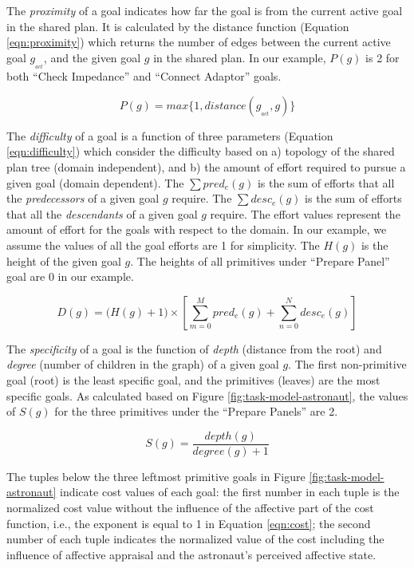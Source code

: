 \documentclass[12pt]{report}
\begin{document}
The \textit{proximity} of a goal indicates how far the goal is from the current
active goal in the shared plan. It is calculated by the distance function
(Equation \ref{eqn:proximity}) which returns the number of edges between the
current active goal $g_{_{act}}$, and the given goal $g$ in the shared plan. In
our example, $P(g)$ is 2 for both ``Check Impedance'' and ``Connect Adaptor''
goals.

\begin{equation}
P(g) = max\big\{1, distance(g_{_{act}},g)\big\}
\label{eqn:proximity}
\end{equation}

The \textit{difficulty} of a goal is a function of three parameters (Equation
\ref{eqn:difficulty}) which consider the difficulty based on a) topology of the
shared plan tree (domain independent), and b) the amount of effort required to
pursue a given goal (domain dependent). The $\sum pred_e(g)$ is the sum of
efforts that all the \textit{predecessors} of a given goal $g$ require. The
$\sum desc_e(g)$ is the sum of efforts that all the \textit{descendants} of a
given goal $g$ require. The effort values represent the amount of effort for the
goals with respect to the domain. In our example, we assume the values of all
the goal efforts are 1 for simplicity. The $H(g)$ is the height of the given
goal $g$. The heights of all primitives under ``Prepare Panel'' goal are 0 in
our example.

\begin{equation}
D(g) = \Big(H(g)+1\Big)\times\left[\sum\limits_{m=0}^{M} pred_e(g) +
\sum\limits_{n=0}^{N} desc_e(g)\right]
\label{eqn:difficulty}
\end{equation}

The \textit{specificity} of a goal is the function of \textit{depth} (distance
from the root) and \textit{degree} (number of children in the graph) of a given
goal $g$. The first non-primitive goal (root) is the least specific goal, and
the primitives (leaves) are the most specific goals. As calculated based on
Figure \ref{fig:task-model-astronaut}, the values of $S(g)$ for the three
primitives under the ``Prepare Panels'' are 2.

\begin{equation}
S(g) = \frac{depth(g)}{degree(g)+1}
\label{eqn:specificity}
\end{equation}

The tuples below the three leftmost primitive goals in Figure
\ref{fig:task-model-astronaut} indicate cost values of each goal: the first
number in each tuple is the normalized cost value without the influence of the
affective part of the cost function, i.e., the exponent is equal to 1 in
Equation \ref{eqn:cost}; the second number of each tuple indicates the
normalized value of the cost including the influence of affective appraisal and
the astronaut's perceived affective state.
\end{document}
